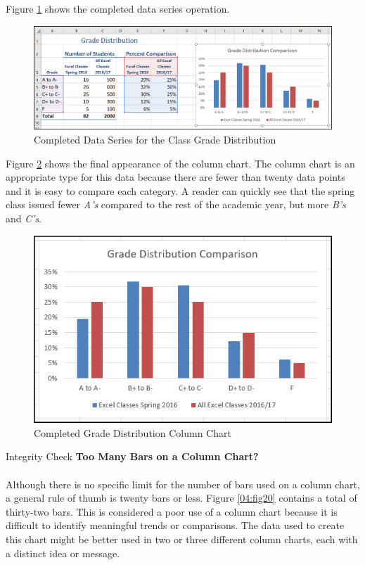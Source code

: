 Figure \ref{04:fig18} shows the completed data series operation.

\begin{figure}[H]
	\centering
	\includegraphics[width=\maxwidth{.95\linewidth}]{gfx/ch04_fig18}
	\caption{Completed Data Series for the Class Grade Distribution}
	\label{04:fig18}
\end{figure}

Figure \ref{04:fig19} shows the final appearance of the column chart. The column chart is an appropriate type for this data because there are fewer than twenty data points and it is easy to compare each category. A reader can quickly see that the spring class issued fewer \textit{A's} compared to the rest of the academic year, but more \textit{B's} and \textit{C's}.

\begin{figure}[H]
	\centering
	\includegraphics[width=\maxwidth{.95\linewidth}]{gfx/ch04_fig19}
	\caption{Completed Grade Distribution Column Chart}
	\label{04:fig19}
\end{figure}

\begin{center}
	\begin{infobox}{Integrity Check}
		\textbf{Too Many Bars on a Column Chart?}
		\\
		\\
		 Although there is no specific limit for the number of bars used on a column chart, a general rule of thumb is twenty bars or less. Figure \ref{04:fig20} contains a total of thirty-two bars. This is considered a poor use of a column chart because it is difficult to identify meaningful trends or comparisons. The data used to create this chart might be better used in two or three different column charts, each with a distinct idea or message.
	\end{infobox}
\end{center}

